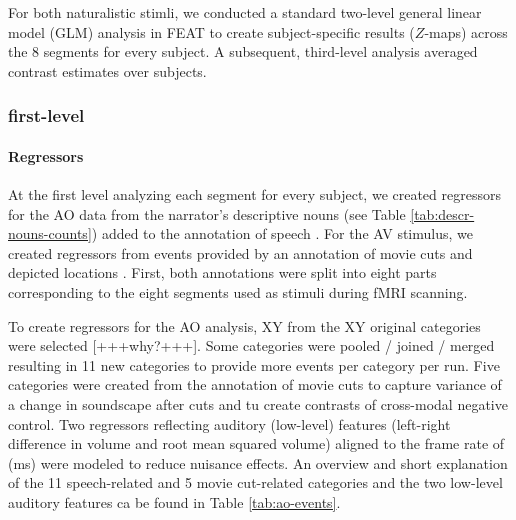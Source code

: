 \documentclass[english]{article}
\begin{document}
For both naturalistic stimli, we conducted a standard two-level general linear
model (GLM) analysis in FEAT to create subject-specific results ($Z$-maps)
across the 8 segments for every subject. A subsequent, third-level analysis averaged contrast estimates over subjects.


\subsubsection{first-level}

\paragraph{Regressors}

At the first level analyzing each segment for every subject, we created
regressors for the AO data from the narrator's descriptive nouns (see Table
\ref{tab:descr-nouns-counts}) added to the annotation of speech
\citep{haeusler2020speechanno}. For the AV stimulus, we created regressors from
events provided by an annotation of movie cuts and depicted locations
\citep{haeusler2016cutanno}.
First, both annotations were split into eight parts corresponding to the eight
segments used as stimuli during fMRI scanning.

To create regressors for the AO analysis, XY from the XY original categories
were selected [+++why?+++]. Some categories were pooled / joined / merged
resulting in 11 new categories to provide more events per category per run.
Five categories were created from the annotation of movie cuts to capture
variance of a change in soundscape after cuts and tu create contrasts of
cross-modal negative control.
Two regressors reflecting auditory (low-level) features (left-right difference
in volume and root mean squared volume) aligned to the frame rate of
(\unit[40]{ms}) were modeled to reduce nuisance effects.
An overview and short explanation of the 11 speech-related and 5 movie
cut-related categories and the two low-level auditory features ca be found in
Table \ref{tab:ao-events}.
\end{document}
